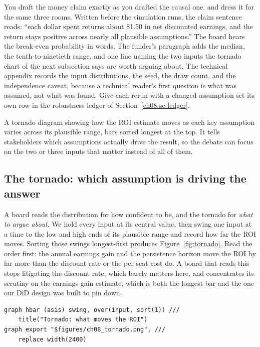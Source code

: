 You draft the money claim exactly as you drafted the causal one, and dress it for the same three rooms. Written before the simulation runs, the claim sentence reads: \enquote{each dollar spent returns about \$1.50 in net discounted earnings, and the return stays positive across nearly all plausible assumptions.} The board hears the break-even probability in words. The funder's paragraph adds the median, the tenth-to-ninetieth range, and one line naming the two inputs the tornado chart of the next subsection says are worth arguing about. The technical appendix records the input distributions, the seed, the draw count, and the independence caveat, because a technical reader's first question is what was assumed, not what was found. Give each rerun with a changed assumption set its own row in the robustness ledger of Section~\ref{ch08-sc-ledger}.

\begin{vizcallout}
A tornado diagram showing how the ROI estimate moves as each key assumption varies across its plausible range, bars sorted longest at the top. It tells stakeholders which assumptions actually drive the result, so the debate can focus on the two or three inputs that matter instead of all of them.
\end{vizcallout}

\subsection{The tornado: which assumption is driving the answer}
A board reads the distribution for how confident to be, and the tornado for \emph{what to argue about}. We hold every input at its central value, then swing one input at a time to the low and high ends of its plausible range and record how far the ROI moves. Sorting those swings longest-first produces Figure~\ref{fig:tornado}. Read the order first: the annual earnings gain and the persistence horizon move the ROI by far more than the discount rate or the per-seat cost do. A board that reads this stops litigating the discount rate, which barely matters here, and concentrates its scrutiny on the earnings-gain estimate, which is both the longest bar and the one our DiD design was built to pin down.

\par
{\footnotesize
\begin{verbatim}
graph hbar (asis) swing, over(input, sort(1)) ///
    title("Tornado: what moves the ROI")
graph export "$figures/ch08_tornado.png", ///
    replace width(2400)
\end{verbatim}
}

